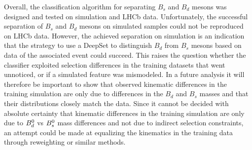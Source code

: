 Overall, the classification algorithm for separating $B_s$ and $B_d$ mesons was designed and tested on simulation and LHCb data. 
Unfortunately, the successful separation of $B_s$ and $B_d$ mesons on simulated samples could not be reproduced on LHCb data.
However, the achieved separation on simulation is an indication that the strategy to use a DeepSet to distinguish $B_d$ from $B_s$ mesons based on data of the associated event could succeed. 
This raises the question whether the classifier exploited selection differences in the training datasets that went unnoticed, or if a simulated feature was mismodeled. 
In a future analysis it will therefore be important to show that observed kinematic differences in the training simulation are only due to differences in the $B_d$ and $B_s$ masses and that their distributions closely match the data. Since it cannot be decided with absolute certainty that kinematic differences in the training simulation are only due to ${{B}^0_{d}}$ vs ${{B}^0_{s}}$ mass differences and not due to indirect selection constraints, an attempt could be made at equalizing the kinematics in the training data through reweighting or similar methods.
